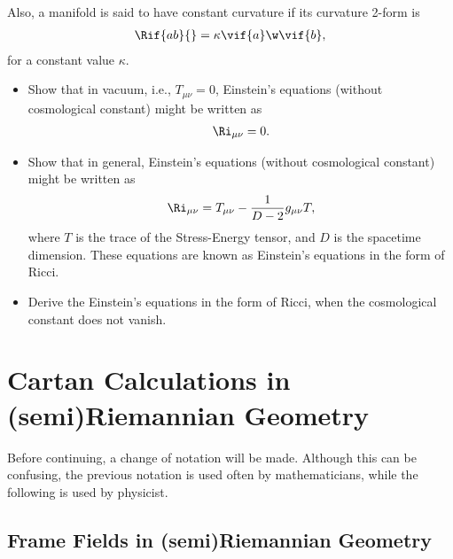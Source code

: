 Also, a manifold is said to have constant curvature if its curvature 2-form is
\begin{align}
  \Rif{ab}{} = \kappa\vif{a}\w\vif{b},
\end{align}
for a constant value $\kappa$.

\begin{Ebox}
  \begin{itemize}
  \item Show that in vacuum, i.e., $T_{\mu\nu}=0$, Einstein's equations (without cosmological constant) might be written as
    \begin{align}
      \Ri_{\mu\nu}=0.
    \end{align}
  \item Show that in general, Einstein's equations  (without cosmological constant) might be written as
    \begin{align}
      \Ri_{\mu\nu}= T_{\mu\nu}-\frac{1}{D-2}g_{\mu\nu} T,
    \end{align}
    where $T$ is the trace of the Stress-Energy tensor,  and  $D$ is the spacetime dimension. These equations are known as Einstein's equations in the form of Ricci.
  \item Derive the Einstein's equations in the form of Ricci, when the cosmological constant does not vanish.
  \end{itemize}
\end{Ebox}




\chapter{Cartan Calculations in (semi)Riemannian Geometry}

Before continuing, a change of notation will be made. Although this can be confusing, the previous notation is used often by mathematicians, while the following is used by physicist.

\section{Frame Fields in (semi)Riemannian Geometry}


